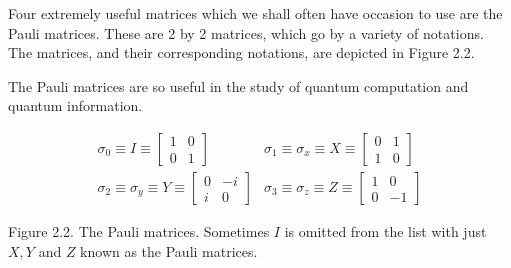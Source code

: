 
Four extremely useful matrices which we shall often have occasion to use are the Pauli matrices. These are 2 by 2 matrices, which go by a variety of notations. The matrices, and their corresponding notations, are depicted in Figure 2.2. 


The Pauli matrices are so useful in the study of quantum computation and quantum information.

$$
\begin{aligned}
\sigma_{0} \equiv I \equiv\left[\begin{array}{rr}
1 & 0 \\
0 & 1
\end{array}\right] & \sigma_{1} \equiv \sigma_{x} \equiv X \equiv\left[\begin{array}{rr}
0 & 1 \\
1 & 0
\end{array}\right] \\
\sigma_{2} \equiv \sigma_{y} \equiv Y \equiv\left[\begin{array}{rr}
0 & -i \\
i & 0
\end{array}\right] & \sigma_{3} \equiv \sigma_{z} \equiv Z \equiv\left[\begin{array}{rr}
1 & 0 \\
0 & -1
\end{array}\right]
\end{aligned}
$$

Figure 2.2. The Pauli matrices. Sometimes $I$ is omitted from the list with just $X, Y$ and $Z$ known as the Pauli matrices.